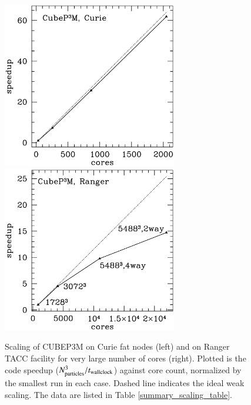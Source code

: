 \documentclass[useAMS,usenatbib]{mn2e}
\begin{document}
\begin{figure}%
  \begin{center}
    \includegraphics[width=3.0in]{graphs/scaling_cubep3m_curie.eps}
    \includegraphics[width=3.0in]{graphs/scaling_cubep3m_new.eps}
  \caption{Scaling of {\small CUBEP3M} on Curie fat nodes (left) and 
    on Ranger TACC facility for very large number of cores (right). Plotted is the code speedup 
    ($N_{\rm particles}^3/t_{\rm wallclock}$) against core count, normalized by the smallest run 
    in each case. Dashed line indicates the ideal weak 
    scaling. The data are listed in Table \ref{summary_scaling_table}.
    \label{scaling}
}
\end{center}
\end{figure}
\end{document}
